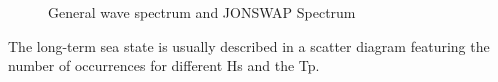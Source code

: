 \begin{figure}[H]
\hfill
{}\hfill
\caption[$\; \:$General wave spectrum and JONSWAP Spectrum]{General wave spectrum and JONSWAP Spectrum \cite{Faltinsen1990}}
\label{fig:spectrum}
\end{figure}

\noindent The long-term sea state is usually described in a scatter diagram featuring the number of occurrences for different Hs and the Tp.  \newline
\newline\newline

